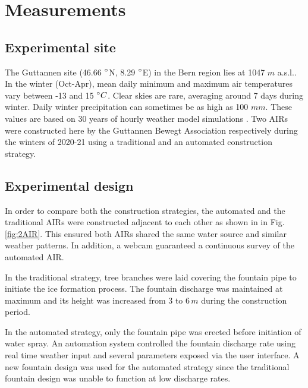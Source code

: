 \documentclass[tc, manuscript]{copernicus}
\begin{document}
\section{Measurements}
\subsection{Experimental site}

The Guttannen site (46.66 $^{\circ}$N, 8.29 $^{\circ}$E) in the Bern region lies at 1047 $m$ a.s.l.. In the winter
(Oct-Apr), mean daily minimum and maximum air temperatures vary between -13 and 15 $^{\circ} C$. Clear skies are
rare, averaging around 7 days during winter. Daily winter precipitation can sometimes be as high as 100 $mm$.
These values are based on 30 years of hourly weather model simulations \citep{guttannen}. Two AIRs were
constructed here by the Guttannen Bewegt Association respectively during the winters of 2020-21 using a
traditional and an automated construction strategy.



\subsection{Experimental design}

In order to compare both the construction strategies, the automated and the traditional AIRs were constructed
adjacent to each other as shown in in Fig. \ref{fig:2AIR}. This ensured both AIRs shared the same water source
and similar weather patterns. In addition, a webcam guaranteed a continuous survey of the automated AIR.   

In the traditional strategy, tree branches were laid covering the fountain pipe to initiate the ice formation
process. The fountain discharge was maintained at maximum and its height was increased from 3 to 6\,$m$ during
the construction period.

In the automated strategy, only the fountain pipe was erected before initiation of water spray. An automation
system controlled the fountain discharge rate using real time weather input and several parameters exposed via
the user interface. A new fountain design was used for the automated strategy since the traditional fountain
design was unable to function at low discharge rates. 
\end{document}
